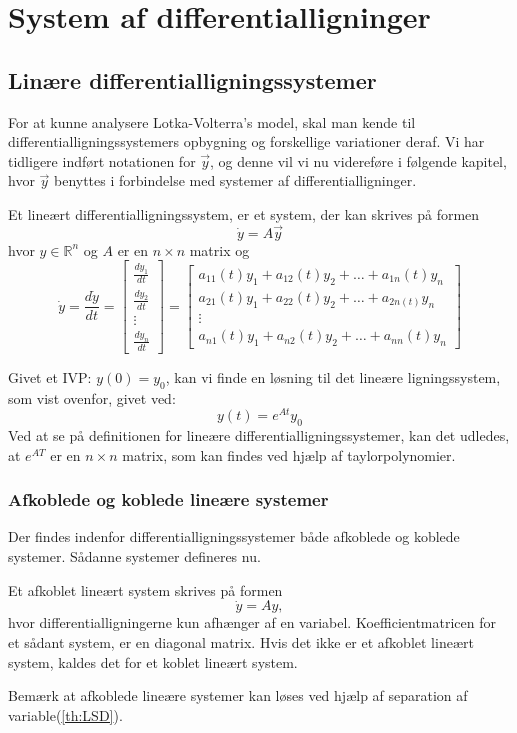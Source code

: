 \chapter{System af differentialligninger}

\section{Linære differentialligningssystemer}
For at kunne analysere Lotka-Volterra's model, skal man kende til differentialligningssystemers opbygning og forskellige variationer deraf. Vi har tidligere indført notationen for $\vec y$, og denne vil vi nu videreføre i følgende kapitel, hvor $\vec y$ benyttes i forbindelse med systemer af differentialligninger. 

\begin{definition}\label{LinSys}
Et lineært differentialligningssystem, er et system, der kan skrives på formen
$$\dot{y} = A \vec{y}$$
hvor $y \in \mathbb{R}^n$ og $A$ er en $n\times n$ matrix og
$$\dot{y} = \frac{d\dot{y}}{dt} = 
\begin{bmatrix}
\frac{dy_1}{dt} \\
\frac{dy_2}{dt}\\
\vdots \\
\frac{dy_n}{dt}
\end{bmatrix}
=
\begin{bmatrix}
a_{11}(t)y_1+a_{12}(t)y_2+ \hdots + a_{1n}(t)y_n\\
a_{21}(t)y_1+a_{22}(t)y_2+ \hdots + a_{2n(t)}y_n\\
\vdots \\
a_{n1}(t)y_1+a_{n2}(t)y_2+ \hdots + a_{nn}(t)y_n
\end{bmatrix}$$
\end{definition}
\hfill \break
Givet et IVP: $y(0) = y_0$, kan vi finde en løsning til det lineære ligningssystem, som vist ovenfor, givet ved:
$$y(t) = e^{At}y_0$$
Ved at se på definitionen for lineære differentialligningssystemer, kan det udledes, at $e^{AT}$ er en $n\times n$ matrix, som kan findes ved hjælp af taylorpolynomier.%

\subsection{Afkoblede og koblede lineære systemer}
Der findes indenfor differentialligningssystemer både afkoblede og koblede systemer. Sådanne systemer defineres nu.
\begin{definition}
Et afkoblet lineært system skrives på formen
$$\dot{y}=Ay,$$ hvor differentialligningerne kun afhænger af en variabel. Koefficientmatricen for et sådant system, er en diagonal matrix. Hvis det ikke er et afkoblet lineært system, kaldes det for et koblet lineært system.
\end{definition}
Bemærk at afkoblede lineære systemer kan løses ved hjælp af separation af variable(\ref{th:LSD}).

